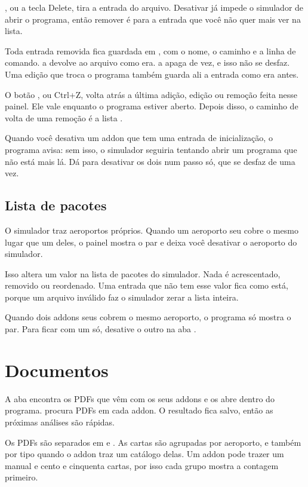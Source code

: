 \documentclass[11pt,a4paper]{article}
\begin{document}
, ou a tecla Delete, tira a entrada do arquivo. Desativar já impede
o simulador de abrir o programa, então remover é para a entrada que você não
quer mais ver na lista.

Toda entrada removida fica guardada em , com o nome, o caminho e a
linha de comando.  a devolve ao arquivo como era.
 a apaga de vez, e isso não se desfaz. Uma edição que troca o
programa também guarda ali a entrada como era antes.


O botão , ou Ctrl+Z, volta atrás a última adição, edição ou remoção
feita nesse painel. Ele vale enquanto o programa estiver aberto. Depois disso, o
caminho de volta de uma remoção é a lista .

Quando você desativa um addon que tem uma entrada de inicialização, o programa
avisa: sem isso, o simulador seguiria tentando abrir um programa que não está
mais lá. Dá para desativar os dois num passo só, que se desfaz de uma vez.

\subsection{Lista de pacotes}

O simulador traz aeroportos próprios. Quando um aeroporto seu cobre o mesmo
lugar que um deles, o painel  mostra o par e deixa você
desativar o aeroporto do simulador.

Isso altera um valor na lista de pacotes do simulador. Nada é acrescentado,
removido ou reordenado. Uma entrada que não tem esse valor fica como está,
porque um arquivo inválido faz o simulador zerar a lista inteira.

Quando dois addons seus cobrem o mesmo aeroporto, o programa só mostra o par.
Para ficar com um só, desative o outro na aba .

\section{Documentos}

A aba  encontra os PDFs que vêm com os seus addons e os abre
dentro do programa.  procura PDFs em cada addon. O
resultado fica salvo, então as próximas análises são rápidas.

Os PDFs são separados em  e . As cartas são agrupadas
por aeroporto, e também por tipo quando o addon traz um catálogo delas. Um addon
pode trazer um manual e cento e cinquenta cartas, por isso cada grupo mostra a
contagem primeiro.
\end{document}
